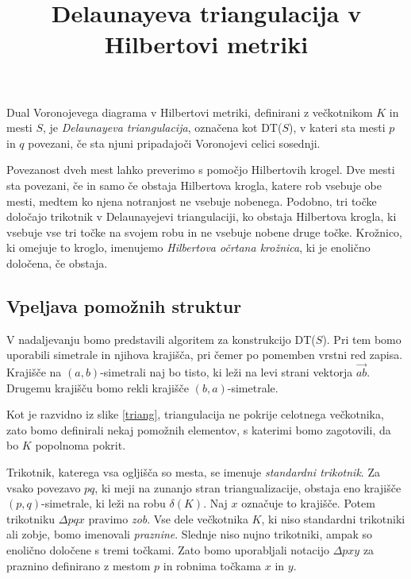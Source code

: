 \documentclass{article}
\title{Delaunayeva triangulacija v Hilbertovi metriki}
\begin{document}
Dual Voronojevega diagrama v Hilbertovi metriki, definirani z večkotnikom $K$ in mesti $S$, je \textit{Delaunayeva triangulacija}, označena kot DT($S$), v kateri sta mesti $p$ in $q$ povezani, če sta njuni pripadajoči Voronojevi celici sosednji.

Povezanost dveh mest lahko preverimo s pomočjo Hilbertovih krogel. Dve mesti sta povezani, če in samo če obstaja Hilbertova krogla, katere rob vsebuje obe mesti, medtem ko njena notranjost ne vsebuje nobenega. Podobno, tri točke določajo trikotnik v Delaunayejevi triangulaciji, ko obstaja Hilbertova krogla, ki vsebuje vse tri točke na svojem robu in ne vsebuje nobene druge točke. Krožnico, ki omejuje to kroglo, imenujemo \textit{Hilbertova očrtana krožnica}, ki je enolično določena, če obstaja.

\subsection{Vpeljava pomožnih struktur}
V nadaljevanju bomo predstavili algoritem za konstrukcijo DT($S$). Pri tem bomo uporabili simetrale in njihova krajišča, pri čemer po pomemben vrstni red zapisa. Krajišče na $(a, b)$-simetrali naj bo tisto, ki leži na levi strani vektorja $\vec{ab}$. Drugemu krajišču bomo rekli krajišče $(b, a)$-simetrale.

Kot je razvidno iz slike \ref*{triang}, triangulacija ne pokrije celotnega večkotnika, zato bomo definirali nekaj pomožnih elementov, s katerimi bomo zagotovili, da bo $K$ popolnoma pokrit.

Trikotnik, katerega vsa ogljišča so mesta, se imenuje \textit{standardni trikotnik}. 
Za vsako povezavo $pq$, ki meji na zunanjo stran triangualizacije, obstaja eno krajišče $(p, q)$-simetrale, ki leži na robu $\delta (K)$. Naj $x$ označuje to krajišče. Potem trikotniku $\Delta pqx$ pravimo \textit{zob}.
Vse dele večkotnika $K$, ki niso standardni trikotniki ali zobje, bomo imenovali \textit{praznine}. Slednje niso nujno trikotniki, ampak so enolično določene s tremi točkami. Zato bomo uporabljali notacijo $\Delta pxy$ za praznino definirano z mestom $p$ in robnima točkama $x$ in $y$.
\end{document}
